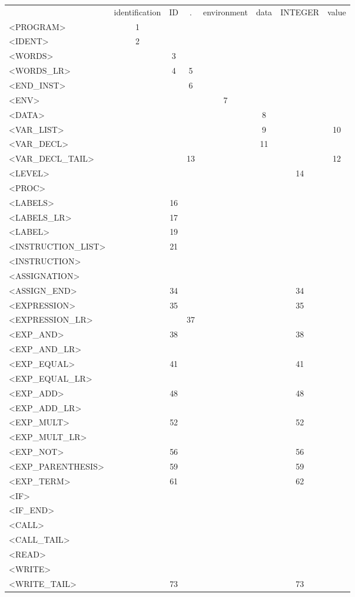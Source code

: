 \documentclass[a4paper,11pt]{article}
\begin{document}
\newpage
\begin{longtable}{l||ccccccc}
	& identification & ID & . & environment & data & INTEGER & value\\
	<PROGRAM> & 1 & & & & & & \\
	<IDENT> & 2 & & & & & & \\
	<WORDS> &  & 3 & & & & & \\
	<WORDS\_LR> & & 4 & 5 & & & & \\
	<END\_INST> & & & 6 & & & & \\
	<ENV> & & & & 7 & & & \\
	<DATA> & & & & & 8 & & \\
	<VAR\_LIST> & & & & & 9 & & 10 \\
	<VAR\_DECL> & & & & & 11 & & \\
	<VAR\_DECL\_TAIL> & & & 13 & & & & 12 \\
	<LEVEL> & & & & & & 14 & \\
	<PROC> & & & & & & & \\
	<LABELS> & & 16 & & & & & \\
	<LABELS\_LR> & & 17 & & & & & \\
	<LABEL> & & 19 & & & & & \\
	<INSTRUCTION\_LIST> & & 21 & & & & & \\
	<INSTRUCTION> & & & & & & & \\
	<ASSIGNATION> & & & & & & & \\
	<ASSIGN\_END> & & 34 & & & & 34 & \\
	<EXPRESSION> & & 35 & & & & 35 & \\
	<EXPRESSION\_LR> & & & 37 & & & & \\
	<EXP\_AND> & & 38 & & & & 38 & \\
	<EXP\_AND\_LR> & & & & & & & \\
	<EXP\_EQUAL> & & 41 & & & & 41 & \\
	<EXP\_EQUAL\_LR> & & & & & & & \\
	<EXP\_ADD> & & 48 & & & & 48 & \\
	<EXP\_ADD\_LR> & & & & & & & \\
	<EXP\_MULT> & & 52 & & & & 52 & \\
	<EXP\_MULT\_LR> & & & & & & & \\
	<EXP\_NOT> & & 56 & & & & 56 & \\
	<EXP\_PARENTHESIS> & & 59 & & & & 59 & \\
	<EXP\_TERM> & & 61 & & & & 62 & \\
	<IF> & & & & & & & \\
	<IF\_END> & & & & & & & \\
	<CALL> & & & & & & & \\
	<CALL\_TAIL> & & & & & & & \\
	<READ> & & & & & & & \\
	<WRITE> & & & & & & & \\
	<WRITE\_TAIL> & & 73 & & & & 73 & \\
\end{longtable}
\end{document}
